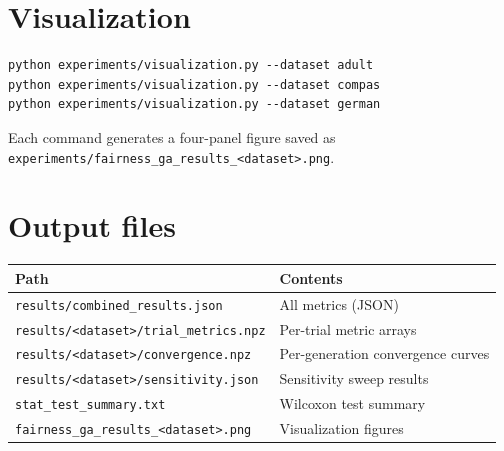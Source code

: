 \documentclass[10pt]{article}
\begin{document}
\section{Visualization}

\begin{verbatim}
python experiments/visualization.py --dataset adult
python experiments/visualization.py --dataset compas
python experiments/visualization.py --dataset german
\end{verbatim}

Each command generates a four-panel figure saved as
\texttt{experiments/fairness\_ga\_results\_<dataset>.png}.

\section{Output files}

\begin{table}[h]
\centering
\small
\begin{tabular}{ll}
\toprule
Path & Contents \\
\midrule
\texttt{results/combined\_results.json} & All metrics (JSON) \\
\texttt{results/<dataset>/trial\_metrics.npz} & Per-trial metric arrays \\
\texttt{results/<dataset>/convergence.npz} & Per-generation convergence curves \\
\texttt{results/<dataset>/sensitivity.json} & Sensitivity sweep results \\
\texttt{stat\_test\_summary.txt} & Wilcoxon test summary \\
\texttt{fairness\_ga\_results\_<dataset>.png} & Visualization figures \\
\bottomrule
\end{tabular}
\end{table}
\end{document}
